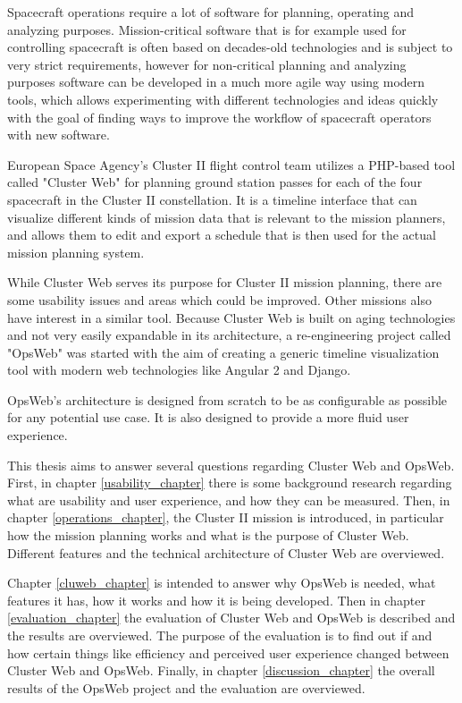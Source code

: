 Spacecraft operations require a lot of software for planning, operating and analyzing purposes. Mission-critical software that is for example used for controlling spacecraft is often based on decades-old technologies and is subject to very strict requirements, however for non-critical planning and analyzing purposes software can be developed in a much more agile way using modern tools, which allows experimenting with different technologies and ideas quickly with the goal of finding ways to improve the workflow of spacecraft operators with new software.

European Space Agency's Cluster II flight control team utilizes a PHP-based tool called "Cluster Web" for planning ground station passes for each of the four spacecraft in the Cluster II constellation. It is a timeline interface that can visualize different kinds of mission data that is relevant to the mission planners, and allows them to edit and export a schedule that is then used for the actual mission planning system.

While Cluster Web serves its purpose for Cluster II mission planning, there are some usability issues and areas which could be improved. Other missions also have interest in a similar tool. Because Cluster Web is built on aging technologies and not very easily expandable in its architecture, a re-engineering project called "OpsWeb" was started with the aim of creating a generic timeline visualization tool with modern web technologies like Angular 2 and Django.

OpsWeb's architecture is designed from scratch to be as configurable as possible for any potential use case. It is also designed to provide a more fluid user experience.

This thesis aims to answer several questions regarding Cluster Web and OpsWeb. First, in chapter \ref{usability_chapter} there is some background research regarding what are usability and user experience, and how they can be measured. Then, in chapter \ref{operations_chapter}, the Cluster II mission is introduced, in particular how the mission planning works and what is the purpose of Cluster Web. Different features and the technical architecture of Cluster Web are overviewed.

Chapter \ref{cluweb_chapter} is intended to answer why OpsWeb is needed, what features it has, how it works and how it is being developed. Then in chapter \ref{evaluation_chapter} the evaluation of Cluster Web and OpsWeb is described and the results are overviewed. The purpose of the evaluation is to find out if and how certain things like efficiency and perceived user experience changed between Cluster Web and OpsWeb. Finally, in chapter \ref{discussion_chapter} the overall results of the OpsWeb project and the evaluation are overviewed.